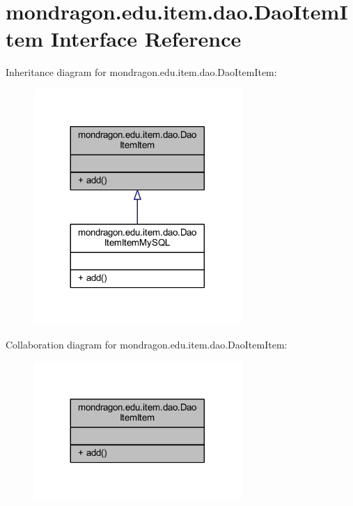 \hypertarget{interfacemondragon_1_1edu_1_1item_1_1dao_1_1_dao_item_item}{}\section{mondragon.\+edu.\+item.\+dao.\+Dao\+Item\+Item Interface Reference}
\label{interfacemondragon_1_1edu_1_1item_1_1dao_1_1_dao_item_item}


Inheritance diagram for mondragon.\+edu.\+item.\+dao.\+Dao\+Item\+Item\+:\nopagebreak
\begin{figure}[H]
\begin{center}
\leavevmode
\includegraphics[width=224pt]{interfacemondragon_1_1edu_1_1item_1_1dao_1_1_dao_item_item__inherit__graph}
\end{center}
\end{figure}


Collaboration diagram for mondragon.\+edu.\+item.\+dao.\+Dao\+Item\+Item\+:\nopagebreak
\begin{figure}[H]
\begin{center}
\leavevmode
\includegraphics[width=224pt]{interfacemondragon_1_1edu_1_1item_1_1dao_1_1_dao_item_item__coll__graph}
\end{center}
\end{figure}
